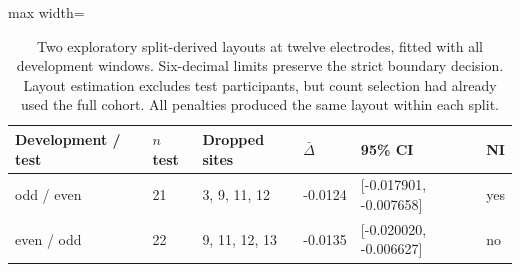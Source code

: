 \begin{table}[htbp]
\centering\small
\caption{Two exploratory split-derived layouts at twelve electrodes, fitted with all development windows. Six-decimal limits preserve the strict boundary decision. Layout estimation excludes test participants, but count selection had already used the full cohort. All penalties produced the same layout within each split.}\label{tab:fixedlayouts}
\begin{adjustbox}{max width=\textwidth}
\begin{tabular}{llllll}\toprule
Development / test & $n$ test & Dropped sites & $\bar\Delta$ & 95\% CI & NI\\\midrule
odd / even & 21 & 3, 9, 11, 12 & -0.0124 & [-0.017901, -0.007658] & yes\\
even / odd & 22 & 9, 11, 12, 13 & -0.0135 & [-0.020020, -0.006627] & no\\
\bottomrule\end{tabular}
\end{adjustbox}
\end{table}
